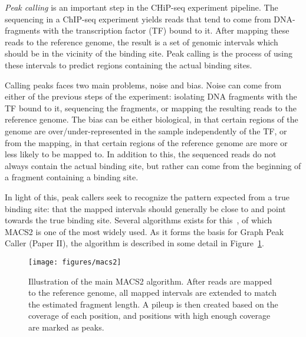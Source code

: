 \emph{Peak calling} is an important step in the CHiP-seq experiment pipeline.
The sequencing in a ChIP-seq experiment yields reads that tend to come from DNA-fragments with the transcription factor (TF) bound to it.
After mapping these reads to the reference genome, the result is a set of genomic intervals which should be in the vicinity of the binding site.
Peak calling is the process of using these intervals to predict regions containing the actual binding sites. 

Calling peaks faces two main problems, noise and bias.
Noise can come from either of the previous steps of the experiment: isolating DNA fragments with the TF bound to it, sequencing the fragments, or mapping the resulting reads to the reference genome.
The bias can be either biological, in that certain regions of the genome are over/under-represented in the sample independently of the TF, or from the mapping, in that certain regions of the reference genome are more or less likely to be mapped to.
In addition to this, the sequenced reads do not always contain the actual binding site, but rather can come from the beginning of a fragment containing a binding site. 

In light of this, peak callers seek to recognize the pattern expected from a true binding site: that the mapped intervals should generally be close to and point towards the true binding site.
Several algorithms exists for this~\cite{SPP, macs}, of which MACS2 is one of the most widely used.
As it forms the basis for Graph Peak Caller (Paper II), the algorithm is described in some detail in Figure~\ref{fig:macs}.

\begin{figure}
  \centering
  \texttt{[image: figures/macs2]}
  \caption{
    Illustration of the main MACS2 algorithm.
    After reads are mapped to the reference genome, all mapped intervals are extended to match the estimated fragment length.
    A pileup is then created based on the coverage of each position, and positions with high enough coverage are marked as peaks.}
  \label{fig:macs}
\end{figure}

% 
% 
% 
% 
% 
% 
% 
% 
% 
% 
% 
% 
% 
% 
% 
% 
% 
% 
% 
% 
% 
% 
% 
% 
% 
% 
% 
% 
% 
% 
% 
% 
% 
% 
% 
% 
% 
% 
% 
% 
% 
% 
% 
% 
% 
% 
% 
% 
% 
% 
% 
% 
% 
% 
% 
% 
% 
% 
% 
% 
% 
% 
% 
% 
% 
% 
% 
% 
% 
% 
% 
% 
% 
% 
% 
% 
% 
% 
% 
% 
% 
% 
% 
% 
% 
% 
% 
% 
% 
% 
% 
% 
% 
% 
% 
% 
% 
% 
% 
% 
% 
% 
% 
% 
% 
% 
% 
% 
% 
% 
